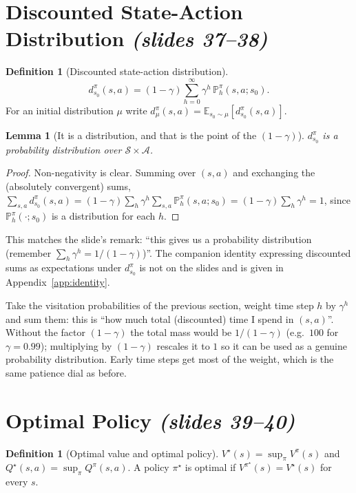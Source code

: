\documentclass[11pt,a4paper]{article}
\newcommand{\E}{\mathbb{E}}
\newcommand{\PP}{\mathbb{P}}
\newcommand{\cS}{\mathcal{S}}
\newcommand{\cA}{\mathcal{A}}
\newcommand{\slr}[1]{\texorpdfstring{\emph{(slides #1)}}{(slides #1)}}
\theoremstyle{plain}
\newtheorem{lemma}[theorem]{Lemma}
\theoremstyle{definition}
\newtheorem{definition}[theorem]{Definition}
\theoremstyle{remark}
\begin{document}
\section{Discounted State-Action Distribution \slr{37--38}}
\begin{definition}[Discounted state-action distribution]\label{def:dsa}
\[
  d^\pi_{s_0}(s,a)=(1-\gamma)\sum_{h=0}^{\infty}\gamma^h\,\PP^\pi_h(s,a;s_0).
\]
For an initial distribution $\mu$ write $d^\pi_\mu(s,a)=\E_{s_0\sim\mu}[d^\pi_{s_0}(s,a)]$.
\end{definition}

\begin{lemma}[It is a distribution, and that is the point of the $(1-\gamma)$]\label{lem:dist}
$d^\pi_{s_0}$ is a probability distribution over $\cS\times\cA$.
\end{lemma}
\begin{proof}
Non-negativity is clear. Summing over $(s,a)$ and exchanging the (absolutely convergent) sums,
$\sum_{s,a}d^\pi_{s_0}(s,a)=(1-\gamma)\sum_h\gamma^h\sum_{s,a}\PP^\pi_h(s,a;s_0)=(1-\gamma)\sum_h\gamma^h=1$, since $\PP^\pi_h(\cdot;s_0)$ is a distribution for each $h$.
\end{proof}
This matches the slide's remark: ``this gives us a probability distribution (remember $\sum_h\gamma^h=1/(1-\gamma)$)''. The companion identity expressing discounted sums as expectations under $d^\pi_{s_0}$ is not on the slides and is given in Appendix~\ref{app:identity}.

\begin{intuition}
Take the visitation probabilities of the previous section, weight time step $h$ by $\gamma^h$ and sum them: this is ``how much total (discounted) time I spend in $(s,a)$''. Without the factor $(1-\gamma)$ the total mass would be $1/(1-\gamma)$ (e.g.\ $100$ for $\gamma=0.99$); multiplying by $(1-\gamma)$ rescales it to $1$ so it can be used as a genuine probability distribution. Early time steps get most of the weight, which is the same patience dial as before.
\end{intuition}

\section{Optimal Policy \slr{39--40}}
\begin{definition}[Optimal value and optimal policy]\label{def:opt}
$V^\star(s)=\sup_\pi V^\pi(s)$ and $Q^\star(s,a)=\sup_\pi Q^\pi(s,a)$. A policy $\pi^\star$ is optimal if $V^{\pi^\star}(s)=V^\star(s)$ for every $s$.
\end{definition}
\end{document}
